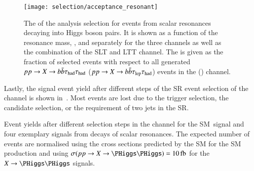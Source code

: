 \begin{figure}[htbp]
  \centering

  \texttt{[image: selection/acceptance\_resonant]}

  \caption[The acceptance times efficiency of the analysis selection for events
  from scalar resonances decaying into Higgs boson pairs.]{The \AccTimesEff of
    the analysis selection for events from scalar resonances decaying into Higgs
    boson pairs. It is shown as a function of the resonance mass, \mX, and
    separately for the three channels as well as the combination of the \lephad
    SLT and LTT channel. The \AccTimesEff is given as the fraction of selected
    events with respect to all generated $pp \to X \to b\bar{b}\tau_{\text{had}}\tau_{\text{had}}$
    ($pp \to X \to b\bar{b}\tau_{\text{lep}}\tau_{\text{had}}$) events in the \hadhad (\lephad) channel.}%
  \label{fig:signal_acceptance_resonant}
\end{figure}

Lastly, the signal event yield after different steps of the SR event selection
of the \hadhad channel is shown in~. Most events are lost due
to the trigger selection, the \tauhadvis candidate selection, or the requirement
of two \btagged jets in the SR.

\begin{sidewaystable}[p]
  \centering

  \caption[Event yields after different selection steps in the \hadhad channel
  for the SM~\HH signal and four exemplary signals from decays of scalar
  resonances.]{Event yields after different selection steps in the \hadhad
    channel for the SM~\HH signal and four exemplary signals from decays of
    scalar resonances. The expected number of events are normalised using the
    cross sections predicted by the SM for the SM \HH production and using
    $\sigma(pp \to X \to \HH) = \SI{10}{\femto\barn}$ for the $X \to \HH$
    signals.}%
  \label{tab:cutflow}

  \resizebox{\textwidth}{!}{
    
  }
\end{sidewaystable}



